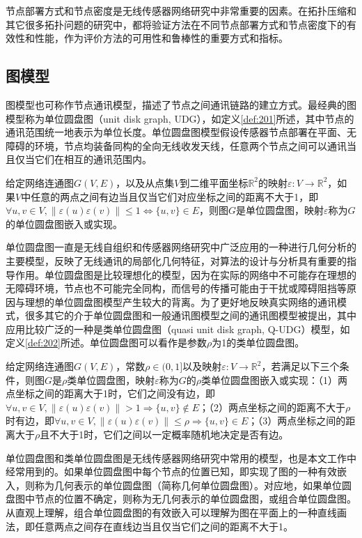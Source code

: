 节点部署方式和节点密度是无线传感器网络研究中非常重要的因素。在拓扑压缩和其它很多拓扑问题的研究中，都将验证方法在不同节点部署方式和节点密度下的有效性和性能，作为评价方法的可用性和鲁棒性的重要方式和指标。
\subsection{图模型}
图模型也可称作节点通讯模型，描述了节点之间通讯链路的建立方式。最经典的图模型称为单位圆盘图（unit disk graph, UDG），如定义\ref{def:201}所述，其中节点的通讯范围统一地表示为单位长度。单位圆盘图模型假设传感器节点部署在平面、无障碍的环境，节点均装备同构的全向无线收发天线，任意两个节点之间可以通讯当且仅当它们在相互的通讯范围内。
\begin{definition}\label{def:201}
给定网络连通图$G(V,E)$，以及从点集$V$到二维平面坐标$\mathbb{R}^2$的映射$\varepsilon:V\to\mathbb{R}^2$，如果$V$中任意的两点之间有边当且仅当它们对应坐标之间的距离不大于1，即$\forall u,v\in{V}, \|\varepsilon(u)\varepsilon(v)\|\le1\Leftrightarrow\{u,v\}\in{E}$，则图$G$是单位圆盘图，映射$\varepsilon$称为$G$的单位圆盘图嵌入或实现。
\end{definition}

单位圆盘图一直是无线自组织和传感器网络研究中广泛应用的一种进行几何分析的主要模型，反映了无线通讯的局部化几何特征，对算法的设计与分析具有重要的指导作用。单位圆盘图是比较理想化的模型，因为在实际的网络中不可能存在理想的无障碍环境，节点也不可能完全同构，而信号的传播可能由于干扰或障碍阻挡等原因与理想的单位圆盘图模型产生较大的背离。为了更好地反映真实网络的通讯模式，很多其它的介于单位圆盘图和一般通讯图模型之间的通讯图模型被提出，其中应用比较广泛的一种是类单位圆盘图（quasi unit disk graph, Q-UDG）模型，如定义\ref{def:202}所述。单位圆盘图可以看作是参数$\rho$为1的类单位圆盘图。
\begin{definition} \label{def:202}
给定网络连通图$G(V,E)$，常数$\rho\in(0,1]$以及映射$\varepsilon:V\to\mathbb{R}^2$，若满足以下三个条件，则图$G$是$\rho$类单位圆盘图，映射$\varepsilon$称为$G$的$\rho$类单位圆盘图嵌入或实现：（1）两点坐标之间的距离大于1时，它们之间没有边，即$\forall u,v\in{V}, \|\varepsilon(u)\varepsilon(v)\|>1\Rightarrow\{u,v\}\notin{E}$；（2）两点坐标之间的距离不大于$\rho$时有边，即$\forall u,v\in{V}, \|\varepsilon(u)\varepsilon(v)\|\le\rho\Rightarrow\{u,v\}\in{E}$；（3）两点坐标之间的距离大于$\rho$且不大于1时，它们之间以一定概率随机地决定是否有边。
\end{definition}

单位圆盘图和类单位圆盘图是无线传感器网络研究中常用的模型，也是本文工作中经常用到的。如果单位圆盘图中每个节点的位置已知，即实现了图的一种有效嵌入，则称为几何表示的单位圆盘图（简称几何单位圆盘图）。对应地，如果单位圆盘图中节点的位置不确定，则称为无几何表示的单位圆盘图，或组合单位圆盘图。从直观上理解，组合单位圆盘图的有效嵌入可以理解为图在平面上的一种直线画法，即任意两点之间存在直线边当且仅当它们之间的距离不大于1。
